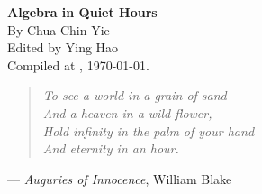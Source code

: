 \documentclass[english,10pt,a5paper]{article}
\theoremstyle{definition}
\begin{document}
	\begin{titlepage}
		\vspace*{4cm}
		\begin{center}
			\Large \textbf{Algebra in Quiet Hours} \smallskip
			\\
			\large	By Chua Chin Yie 
			\\[1em] \small Edited by Ying Hao 
			\\ \small Compiled at \currenttime, \today.
			\\[2em]
		\end{center}
		\vfill\vfill
		\begin{center}
			\small
			\begin{minipage}{0.7\textwidth}
				\begin{verse}
					\itshape
					To see a world in a grain of sand \\
					And a heaven in a wild flower, \\
					Hold infinity in the palm of your hand \\
					And eternity in an hour.
				\end{verse}
				
				\hspace{0.26\textwidth} %
				--- \textit{Auguries of Innocence}, William Blake
				
			\end{minipage}
		\end{center}
		\vfill
\end{titlepage}
	
\clearpage
    \tableofcontents 
    
    
\clearpage
{}
    
\begingroup
\allowdisplaybreaks
{




















}\endgroup

\clearpage
{}
\printbibliography
\end{document}
